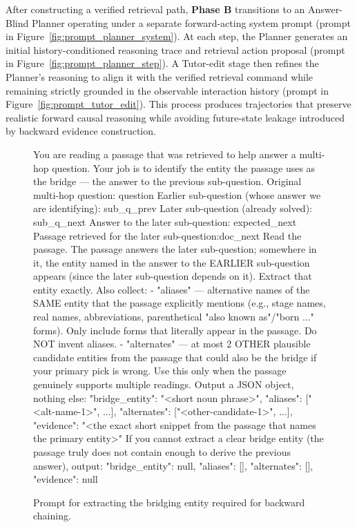 \documentclass{llmxive}
\begin{document}
After constructing a verified retrieval path, \textbf{Phase B} transitions to an Answer-Blind Planner operating under a separate forward-acting system prompt (prompt in Figure~\ref{fig:prompt_planner_system}). At each step, the Planner generates an initial history-conditioned reasoning trace and retrieval action proposal (prompt in Figure~\ref{fig:prompt_planner_step}). A Tutor-edit stage then refines the Planner's reasoning to align it with the verified retrieval command while remaining strictly grounded in the observable interaction history (prompt in Figure~\ref{fig:prompt_tutor_edit}). This process produces trajectories that preserve realistic forward causal reasoning while avoiding future-state leakage introduced by backward evidence construction.







\begin{figure}[!t]
\begin{promptbox}
You are reading a passage that was retrieved to help answer a multi-hop question. Your job is to identify the entity the passage uses as the bridge — the answer to the previous sub-question.
Original multi-hop question: {question}
Earlier sub-question (whose answer we are identifying): {sub_q_prev}
Later sub-question (already solved): {sub_q_next}
Answer to the later sub-question: {expected_next}
Passage retrieved for the later sub-question:{doc_next}
Read the passage. The passage answers the later sub-question; somewhere in it, the entity named in the answer to the EARLIER sub-question appears (since the later sub-question depends on it). Extract that entity exactly.
Also collect:
- "aliases" — alternative names of the SAME entity that the passage explicitly mentions (e.g., stage names, real names, abbreviations, parenthetical "also known as"/"born ..." forms). Only include forms that literally appear in the passage. Do NOT invent aliases.
- "alternates" — at most 2 OTHER plausible candidate entities from the passage that could also be the bridge if your primary pick is wrong. Use this only when the passage genuinely supports multiple readings.
Output a JSON object, nothing else: {{"bridge_entity": "<short noun phrase>", "aliases": ["<alt-name-1>", ...], "alternates": ["<other-candidate-1>", ...], "evidence": "<the exact short snippet from the passage that names the primary entity>"}}
If you cannot extract a clear bridge entity (the passage truly does not contain enough to derive the previous answer), output:
{{"bridge_entity": null, "aliases": [], "alternates": [], "evidence": null}}
\end{promptbox}
\vspace{-0.4cm}
\caption{Prompt for extracting the bridging entity required for backward chaining.}
\label{fig:prompt_bridge_extraction}
\end{figure}
\end{document}
